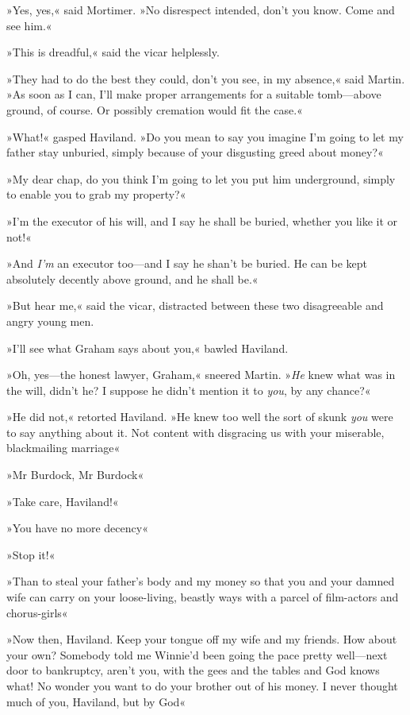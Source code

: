 »Yes, yes,« said Mortimer. »No disrespect intended, don't you know. Come and see him.«

»This is dreadful,« said the vicar helplessly.

»They had to do the best they could, don't you see, in my absence,« said Martin. »As soon as I can, I'll make proper arrangements for a suitable tomb—above ground, of course. Or possibly cremation would fit the case.«

»What!« gasped Haviland. »Do you mean to say you imagine I'm going to let my father stay unburied, simply because of your disgusting greed about money?«

»My dear chap, do you think I'm going to let you put him underground, simply to enable you to grab my property?«

»I'm the executor of his will, and I say he shall be buried, whether you like it or not!«

»And \textit{I'm} an executor too—and I say he shan't be buried. He can be kept absolutely decently above ground, and he shall be.«

»But hear me,« said the vicar, distracted between these two disagreeable and angry young men.

»I'll see what Graham says about you,« bawled Haviland.

»Oh, yes—the honest lawyer, Graham,« sneered Martin. »\textit{He} knew what was in the will, didn't he? I suppose he didn't mention it to \textit{you}, by any chance?«

»He did not,« retorted Haviland. »He knew too well the sort of skunk \textit{you} were to say anything about it. Not content with disgracing us with your miserable, blackmailing marriage\longdash«

»Mr Burdock, Mr Burdock\longdash«

»Take care, Haviland!«

»You have no more decency\longdash«

»Stop it!«

»Than to steal your father's body and my money so that you and your damned wife can carry on your loose-living, beastly ways with a parcel of film-actors and chorus-girls\longdash«

»Now then, Haviland. Keep your tongue off my wife and my friends. How about your own? Somebody told me Winnie'd been going the pace pretty well—next door to bankruptcy, aren't you, with the gees and the tables and God knows what! No wonder you want to do your brother out of his money. I never thought much of you, Haviland, but by God\longdash«

